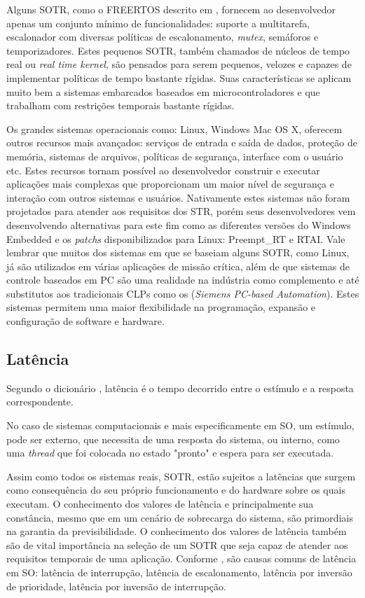 Alguns SOTR, como o FREERTOS descrito em \cite{Barry2016}, fornecem ao desenvolvedor apenas um conjunto mínimo de funcionalidades: suporte a multitarefa, escalonador com diversas políticas de escalonamento, \textit{mutex}, semáforos e temporizadores. Estes pequenos SOTR, também chamados de núcleos de tempo real ou \textit{ real time kernel}, são pensados para serem pequenos, velozes e capazes de implementar políticas de tempo bastante rígidas. Suas características se aplicam muito bem a sistemas embarcados baseados em microcontroladores e que trabalham com restrições temporais bastante rígidas.

Os grandes sistemas operacionais como: Linux, Windows Mac OS X, oferecem outros recursos mais avançados: serviços de entrada e saída de dados, proteção de memória, sistemas de arquivos, políticas de segurança, interface com o usuário etc. Estes recursos tornam possível ao desenvolvedor construir e executar aplicações mais complexas que proporcionam um maior nível de segurança e interação com outros sistemas e usuários. Nativamente estes sistemas não foram projetados para atender aos requisitos dos STR, porém seus desenvolvedores vem desenvolvendo alternativas para este fim como as diferentes versões do Windows Embedded e os \textit{patchs} disponibilizados para Linux: Preempt\_RT e RTAI. Vale lembrar que muitos dos sistemas em que se baseiam alguns SOTR, como Linux, já são utilizados em várias aplicações de missão crítica, além de que sistemas de controle baseados em PC são uma realidade na indústria como complemento e até substitutos aos tradicionais CLPs como os (\textit{Siemens PC-based Automation}). Estes sistemas permitem uma maior flexibilidade na programação, expansão e configuração de software e hardware.

\subsection{Latência}
Segundo o dicionário \cite{Priberam}, latência é o tempo decorrido entre o estímulo e a resposta correspondente.

No caso de sistemas computacionais e mais especificamente em SO, um estímulo, pode ser externo, que necessita de uma resposta do sistema, ou interno, como uma \textit{thread} que foi colocada no estado "pronto" e espera para ser executada.

Assim como todos os sistemas reais, SOTR, estão sujeitos a latências que surgem como consequência do seu próprio funcionamento e do hardware sobre os quais executam. O conhecimento dos valores de latência e principalmente sua constância, mesmo que em um cenário de sobrecarga do sistema, são primordiais na garantia da previsibilidade. O conhecimento dos valores de latência também são de vital importância na seleção de um SOTR que seja capaz de atender aos requisitos temporais de uma aplicação. Conforme \cite{Rostedt2007}, são causas comuns de latência em SO: latência de interrupção, latência de escalonamento, latência por inversão de prioridade, latência por inversão de interrupção.

